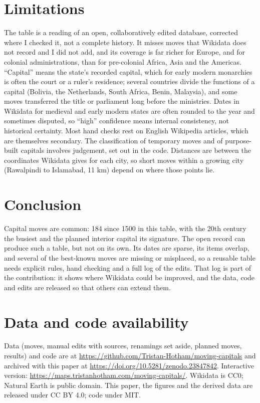\documentclass[11pt,a4paper]{article}
\begin{document}
\section{Limitations}
The table is a reading of an open, collaboratively edited database, corrected where I checked it, not a complete history. It misses moves that Wikidata does not record and I did not add, and its coverage is far richer for Europe, and for colonial administrations, than for pre-colonial Africa, Asia and the Americas. ``Capital'' means the state's recorded capital, which for early modern monarchies is often the court or a ruler's residence; several countries divide the functions of a capital (Bolivia, the Netherlands, South Africa, Benin, Malaysia), and some moves transferred the title or parliament long before the ministries. Dates in Wikidata for medieval and early modern states are often rounded to the year and sometimes disputed, so ``high'' confidence means internal consistency, not historical certainty. Most hand checks rest on English Wikipedia articles, which are themselves secondary. The classification of temporary moves and of purpose-built capitals involves judgement, set out in the code. Distances are between the coordinates Wikidata gives for each city, so short moves within a growing city (Rawalpindi to Islamabad, 11 km) depend on where those points lie.

\section{Conclusion}
Capital moves are common: 184 since 1500 in this table, with the 20th century the busiest and the planned interior capital its signature. The open record can produce such a table, but not on its own. Its dates are sparse, its items overlap, and several of the best-known moves are missing or misplaced, so a reusable table needs explicit rules, hand checking and a full log of the edits. That log is part of the contribution: it shows where Wikidata could be improved, and the data, code and edits are released so that others can extend them.

\section*{Data and code availability}
Data (moves, manual edits with sources, renamings set aside, planned moves, results) and code are at \url{https://github.com/Tristan-Hotham/moving-capitals} and archived with this paper at \href{https://doi.org/10.5281/zenodo.23847842}{https://doi.org/10.5281/zenodo.23847842}. Interactive version: \url{https://maps.tristanhotham.com/moving-capitals/}. Wikidata is CC0; Natural Earth is public domain. This paper, the figures and the derived data are released under CC BY 4.0; code under MIT.
\end{document}
